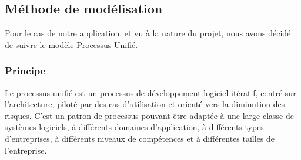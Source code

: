 \documentclass[12 pt ]{report}
\begin{document}
\subsection{  Méthode de modélisation }
Pour le cas de notre application, et vu à la nature du projet, nous avons décidé de suivre le modèle Processus Unifié.
\subsubsection{Principe}
Le processus unifié est un processus de développement logiciel itératif, centré sur l'architecture, piloté par des cas d'utilisation et orienté vers la diminution des risques. C’est un patron de processus pouvant être adaptée à une large classe de systèmes logiciels, à différents domaines d'application, à différents types d'entreprises, à différents niveaux de compétences et à différentes tailles de l'entreprise.
\newpage
\end{document}
